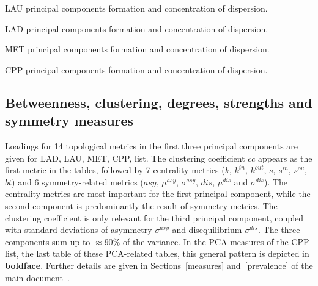 \begin{table}[!h]
	\caption{LAU principal components formation and concentration of dispersion.}
	\footnotesize
	
\label{tab:pcain}
\end{table}
\begin{table}[!h]
	\caption{LAD principal components formation and concentration of dispersion.}
	\footnotesize
	
\label{tab:pcain}
\end{table}
\begin{table}[!h]
	\caption{MET principal components formation and concentration of dispersion.}
	\footnotesize
	
\label{tab:pcain}
\end{table}
\begin{table}[!h]
	\caption{CPP principal components formation and concentration of dispersion.}
	\footnotesize
	
\label{tab:pcain}
\end{table}


\FloatBarrier
\subsection{Betweenness, clustering, degrees, strengths and symmetry measures}

Loadings for 14 topological metrics in the first three principal components are given for LAD, LAU, MET, CPP, list.
The clustering coefficient $cc$ appears as the first metric in the tables, followed by 7 centrality metrics ($k$, $k^{in}$, $k^{out}$, $s$, $s^{in}$, $s^{ou}$, $bt$) and 6 symmetry-related metrics ($asy$, $\mu^{asy}$, $\sigma^{asy}$, $dis$, $\mu^{dis}$ and $\sigma^{dis}$).
The centrality metrics are most important for the first principal component, while the second component is predominantly the result of symmetry metrics.
The clustering coefficient is only relevant for the third principal component, coupled with standard deviations of asymmetry $\sigma^{asy}$ and disequilibrium $\sigma^{dis}$.
The three components sum up to $\approx90\%$ of the variance.
In the PCA measures of the CPP list, the last table of these PCA-related tables, this general pattern is depicted in {\bf boldface}.
Further details are given in Sections~\ref*{measures} and~\ref*{prevalence} of the main document~\cite{tpaper}.

